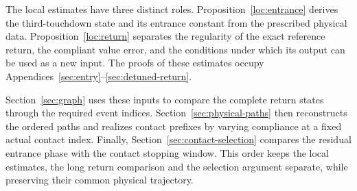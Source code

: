 The local estimates have three distinct roles.
Proposition~\ref{loc:entrance} derives the third-touchdown state and
its entrance constant from the prescribed physical data.
Proposition~\ref{loc:return} separates the regularity of the exact
reference return, the compliant value error, and the conditions under
which its output can be used as a new input. The proofs of these
estimates occupy Appendices~\ref{sec:entry}--\ref{sec:detuned-return}.

Section~\ref{sec:graph} uses these inputs to compare the complete
return states through the required event indices.
Section~\ref{sec:physical-paths} then reconstructs the ordered paths
and realizes contact prefixes by varying compliance at a fixed
actual contact index. Finally,
Section~\ref{sec:contact-selection} compares the residual entrance
phase with the contact stopping window. This order keeps the local
estimates, the long return comparison and the selection argument
separate, while preserving their common physical trajectory.
